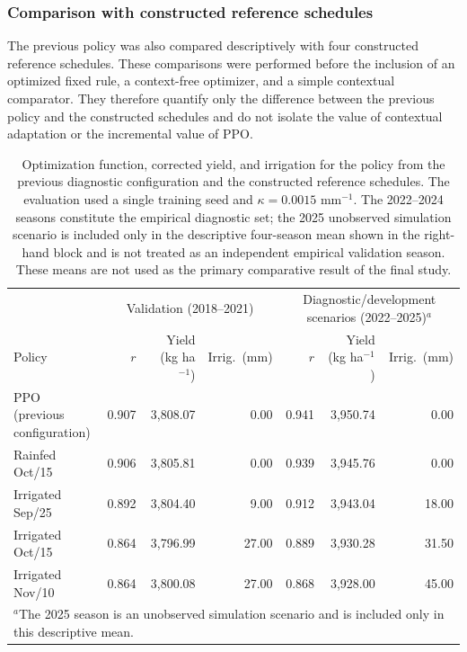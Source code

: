 \documentclass[times,final,authoryear]{elsarticle}
\begin{document}
\subsubsection{Comparison with constructed reference schedules}
\label{subres_diagnostic_schedules}

The previous policy was also compared descriptively with four constructed reference schedules. These comparisons were performed before the inclusion of an optimized fixed rule, a context-free optimizer, and a simple contextual comparator. They therefore quantify only the difference between the previous policy and the constructed schedules and do not isolate the value of contextual adaptation or the incremental value of PPO.

\begin{table}[!h]
\centering
\footnotesize
\caption{Optimization function, corrected yield, and irrigation for the policy from the previous diagnostic configuration and the constructed reference schedules. The evaluation used a single training seed and $\kappa=0.0015$ mm$^{-1}$. The 2022--2024 seasons constitute the empirical diagnostic set; the 2025 unobserved simulation scenario is included only in the descriptive four-season mean shown in the right-hand block and is not treated as an independent empirical validation season. These means are not used as the primary comparative result of the final study.}
\label{tab_comparacao_baselines}
\begin{tabular}{lrrrrrr}
\hline
 & \multicolumn{3}{c}{Validation (2018--2021)} & \multicolumn{3}{c}{Diagnostic/development scenarios (2022--2025)$^{a}$} \\
Policy & $r$ & Yield (kg ha$^{-1}$) & Irrig.\ (mm) & $r$ & Yield (kg ha$^{-1}$) & Irrig.\ (mm) \\
\hline
PPO (previous configuration) & 0.907 & 3,808.07 & 0.00 & 0.941 & 3,950.74 & 0.00 \\
Rainfed Oct/15              & 0.906 & 3,805.81 & 0.00 & 0.939 & 3,945.76 & 0.00 \\
Irrigated Sep/25            & 0.892 & 3,804.40 & 9.00 & 0.912 & 3,943.04 & 18.00 \\
Irrigated Oct/15            & 0.864 & 3,796.99 & 27.00 & 0.889 & 3,930.28 & 31.50 \\
Irrigated Nov/10            & 0.864 & 3,800.08 & 27.00 & 0.868 & 3,928.00 & 45.00 \\
\hline
\multicolumn{7}{l}{\scriptsize $^{a}$The 2025 season is an unobserved simulation scenario and is included only in this descriptive mean.}
\end{tabular}
\end{table}
\end{document}
